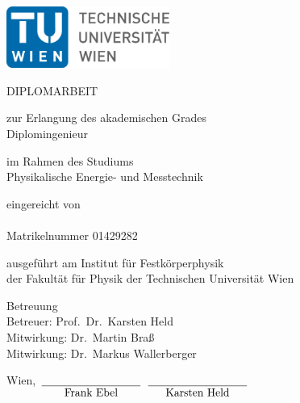 
\begin{titlepage}
    \includegraphics[width=0.4\textwidth]{graphics/figures/logo_tu.pdf}
    \begin{center}
        \vspace{1.5cm}

        {\large DIPLOMARBEIT}

        \vspace{1em}

        {\Huge \textbf{\@title}}

        \vspace{2em}

        \begin{large}
            zur Erlangung des akademischen Grades\\
            Diplomingenieur

            \vspace{1em}

            im Rahmen des Studiums\\
            Physikalische Energie- und Messtechnik

            \vspace{1em}

            eingereicht von\\
            \@author\\
            Matrikelnummer 01429282\\
        \end{large}
    \end{center}

    \vspace{4em}

    \noindent ausgeführt am Institut für Festkörperphysik\\
    der Fakultät für Physik der Technischen Universität Wien

    \vspace{1em}

    \noindent Betreuung\\
    Betreuer: Prof.\ Dr.\ Karsten Held\\
    Mitwirkung: Dr.\ Martin Braß\\
    Mitwirkung: Dr.\ Markus Wallerberger

    \vspace{5em}

    \noindent Wien, \@date
    \hspace{4em}
    $\underset{\text{\normalsize Frank Ebel}}{\underline{\hspace{9em}}}$
    \hspace{4em}
    $\underset{\text{\normalsize Karsten Held}}{\underline{\hspace{9em}}}$
\end{titlepage}
